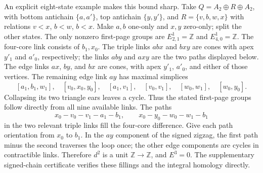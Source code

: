 \documentclass[11pt]{article}
\begin{document}
An explicit eight-state example makes this bound sharp.  Take
$Q=A_2\oplus R\oplus A_2$, with bottom antichain $\{a,a'\}$,
top antichain $\{y,y'\}$, and
$R=\{v,b,w,x\}$ with relations $v<x$, $b<w$, $b<x$.
Make $a,b$ one-only and $x,y$ zero-only; split the other states.
The only nonzero first-page groups are
$E^1_{2,1}=\mathbb Z$ and $E^1_{4,0}=\mathbb Z$.
The four-core link consists of $b_1,x_0$.  The triple links $abx$ and
$bxy$ are cones with apex $y'_1$ and $a'_0$, respectively; the links $aby$
and $axy$ are the two paths displayed below.  The edge links $ax$, $by$,
and $bx$ are cones, with apex $y'_1$, $a'_0$, and either of those vertices.
The remaining edge link $ay$ has maximal simplices
\[
 [a_1,b_1,w_1],\quad[v_0,x_0,y_0],\quad
 [a_1,v_1],\quad[v_0,v_1],\quad[w_0,w_1],\quad[w_0,y_0].
\]
Collapsing its two triangle ears leaves a cycle.  Thus the stated first-page
groups follow directly from all nine available links.  The paths
\[
 x_0-v_0-v_1-a_1-b_1,\qquad
 x_0-y_0-w_0-w_1-b_1
\]
in the two relevant triple links fill the four-core difference.
Give each path orientation from $x_0$ to $b_1$.  In the $ay$ component
of the signed zigzag, the first path minus the second traverses the loop once;
the other edge components are cycles in contractible links.  Therefore
$d^2$ is a unit $\mathbb Z\to\mathbb Z$, and $E^3=0$.
The supplementary signed-chain certificate verifies these fillings and
the integral homology directly.
\end{document}
